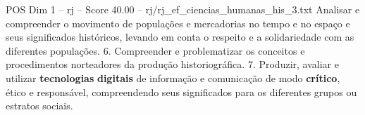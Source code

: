 \begin{textsample}{POS Dim 1 – rj – Score 40.00 – rj/rj\_ef\_ciencias\_humanas\_his\_3.txt}
Analisar e compreender o movimento de populações e mercadorias no tempo e no espaço e seus significados históricos, levando em conta o respeito e a solidariedade com as diferentes populações. 6.
Compreender e problematizar os conceitos e procedimentos norteadores da produção historiográfica. 7.
Produzir, avaliar e utilizar \textbf{tecnologias} \textbf{digitais} de informação e comunicação de modo \textbf{crítico}, ético e responsável, compreendendo seus significados para os diferentes grupos ou estratos sociais.

\end{textsample}
